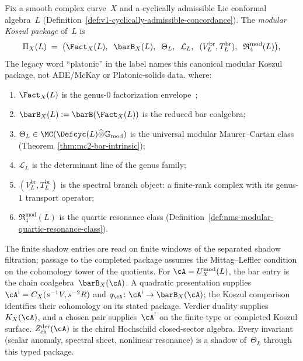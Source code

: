 \begin{construction}
\label{constr:v1-platonic-package-concordance}
Fix a smooth complex curve~$X$ and a cyclically admissible Lie
conformal algebra~$L$
(Definition~\ref{def:v1-cyclically-admissible-concordance}).
The \emph{modular Koszul package} of~$L$ is
\[
\Pi_X(L)
\;=\;
\bigl(
 \Fact_X(L),\;\;
 \barB_X(L),\;\;
 \Theta_L,\;\;
 \mathcal{L}_L,\;\;
 (V_L^{\mathrm{br}}, T_L^{\mathrm{br}}),\;\;
\mathfrak{R}_4^{\mathrm{mod}}(L)
\bigr),
\]
The legacy word ``platonic'' in the label names this canonical
modular Koszul package, not ADE/McKay or Platonic-solids data.
where:
\begin{enumerate}[label=\textup{(\arabic*)}]
\item $\Fact_X(L)$ is the genus-$0$ factorization
 envelope~\cite[\S3.7]{BD04};
\item $\barB_X(L) := \barB(\Fact_X(L))$ is the reduced bar
 coalgebra;
\item $\Theta_L \in
 \MC(\Defcyc(L) \widehat\otimes \mathbb{G}_{\mathrm{mod}})$
 is the universal modular Maurer--Cartan class
 (Theorem~\ref{thm:mc2-bar-intrinsic});
\item $\mathcal{L}_L$ is the determinant line of the genus
 family;
\item $(V_L^{\mathrm{br}}, T_L^{\mathrm{br}})$ is the
 spectral branch object: a finite-rank complex with its
 genus-$1$ transport operator;
\item $\mathfrak{R}_4^{\mathrm{mod}}(L)$ is the quartic
 resonance class
 (Definition~\ref{def:nms-modular-quartic-resonance-class}).
\end{enumerate}
The finite shadow entries are read on finite windows of the separated
shadow filtration; passage to the completed package assumes the
Mittag--Leffler condition on the cohomology tower of the quotients.
For \(\cA=U_X^{\mathrm{mod}}(L)\), the bar entry is the chain
coalgebra~$\barB_X(\cA)$. A quadratic presentation supplies
\(\cA^{\mathrm i}=C_X(s^{-1}V,s^{-2}R)\) and
$q_\cA\colon\cA^{\mathrm i}\to\barB_X(\cA)$; the Koszul comparison
identifies their cohomology on its stated package. Verdier duality
supplies $K_X(\cA)$, and a chosen pair supplies~\(\cA^!\) on
the finite-type or completed Koszul surface.
\(Z^{\mathrm{der}}_{\mathrm{ch}}(\cA)\) is the chiral Hochschild
closed-sector algebra. Every invariant \textup{(}scalar anomaly, spectral
sheet, nonlinear resonance\textup{)} is a shadow of~\(\Theta_L\)
through this typed package.
\end{construction}

